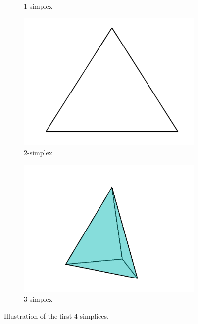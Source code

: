 \begin{figure}[ht]
\begin{subfigure}[b]{0.2\textwidth}
        \caption{1-simplex}
        \label{fig:1-simplex}
    \end{subfigure}
    \hfill
    \begin{subfigure}[b]{0.2\textwidth}
        \centering
        \includegraphics[width=\textwidth]{report/Images/Theory/simplices/simplices2.png}
        \caption{2-simplex}
        \label{fig:2-simplex}
    \end{subfigure}
    \hfill
    \begin{subfigure}[b]{0.2\textwidth}
        \centering
        \includegraphics[width=\textwidth]{report/Images/Theory/simplices/simplices3.png}
        \caption{3-simplex}
        \label{fig:3-simplex}
    \end{subfigure}
    \hfill
    \caption{Illustration of the first 4 simplices.}
    \label{fig:simplices}
\end{figure}

